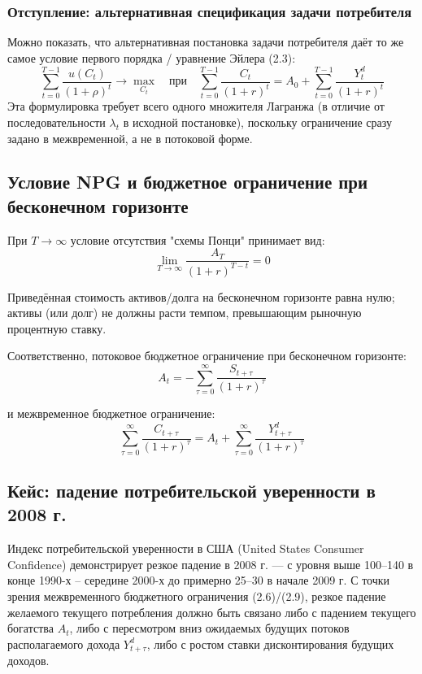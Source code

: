 \documentclass[10pt,a4paper]{article}
\begin{document}
\subsubsection*{Отступление: альтернативная спецификация задачи потребителя}
 
Можно показать, что альтернативная постановка задачи потребителя даёт то же самое условие первого порядка / уравнение Эйлера (2.3):
\[
\sum_{t=0}^{T-1}\frac{u(C_t)}{(1+\rho)^t} \to \max_{C_t}\quad\text{при}\quad \sum_{t=0}^{T-1}\frac{C_t}{(1+r)^t} = A_0 + \sum_{t=0}^{T-1}\frac{Y_t^d}{(1+r)^t} \tag{2.6'}
\]
Эта формулировка требует всего одного множителя Лагранжа (в отличие от последовательности $\lambda_t$ в исходной постановке), поскольку ограничение сразу задано в межвременной, а не в потоковой форме.
 
\subsection{Условие NPG и бюджетное ограничение при бесконечном горизонте}
 
При $T\to\infty$ условие отсутствия "схемы Понци" принимает вид:
\begin{equation}
\lim_{T\to\infty}\frac{A_T}{(1+r)^{T-t}} = 0 \tag{2.7}
\end{equation}
 
\begin{intuition}
Приведённая стоимость активов/долга на бесконечном горизонте равна нулю; активы (или долг) не должны расти темпом, превышающим рыночную процентную ставку.
\end{intuition}
 
Соответственно, потоковое бюджетное ограничение при бесконечном горизонте:
\begin{equation}
A_t = -\sum_{\tau=0}^{\infty}\frac{S_{t+\tau}}{(1+r)^\tau} \tag{2.8}
\end{equation}
 
и межвременное бюджетное ограничение:
\begin{equation}
\sum_{\tau=0}^{\infty}\frac{C_{t+\tau}}{(1+r)^\tau} = A_t + \sum_{\tau=0}^{\infty}\frac{Y_{t+\tau}^d}{(1+r)^\tau} \tag{2.9}
\end{equation}
 
\subsection{Кейс: падение потребительской уверенности в 2008 г.}
 
Индекс потребительской уверенности в США (United States Consumer Confidence) демонстрирует резкое падение в 2008 г. — с уровня выше 100--140 в конце 1990-х -- середине 2000-х до примерно 25--30 в начале 2009 г. С точки зрения межвременного бюджетного ограничения (2.6)/(2.9), резкое падение желаемого текущего потребления должно быть связано либо с падением текущего богатства $A_t$, либо с пересмотром вниз ожидаемых будущих потоков располагаемого дохода $Y_{t+\tau}^d$, либо с ростом ставки дисконтирования будущих доходов.
 
\end{document}

